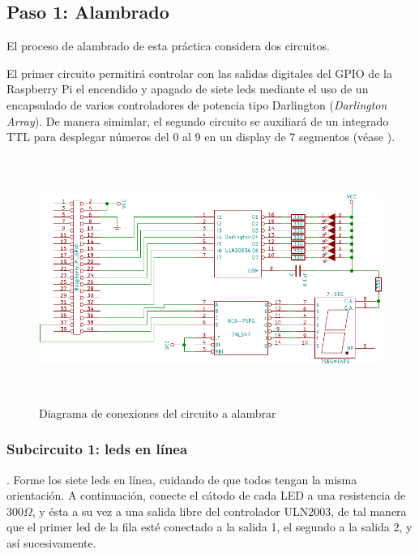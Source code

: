 \documentclass[letterpaper,10.5pt]{article}
\begin{document}
%
%
\subsection{Paso 1: Alambrado}%
\label{sec:step1}

El proceso de alambrado de esta práctica considera dos circuitos.

El primer circuito permitirá controlar con las salidas digitales del GPIO de la Raspberry Pi el encendido y apagado de siete leds mediante el uso de un encapsulado de varios controladores de potencia tipo Darlington (\textit{Darlington Array}).
De manera simimlar, el segundo circuito se auxiliará de un integrado TTL para desplegar números del 0 al 9 en un display de 7 segmentos (véase ).

\begin{figure}[H]
	\centering%
	\includegraphics[width=0.9\columnwidth,height=8cm,keepaspectratio]{img/p03-diagram.pdf} %
	\caption{Diagrama de conexiones del circuito a alambrar}
	\label{fig:wiring-diagram} %
\end{figure}

\subsubsection{Subcircuito 1: leds en línea}.
Forme los siete leds en línea, cuidando de que todos tengan la misma orientación. A continuación, conecte el cátodo de cada LED a una resistencia de 300$\Omega$, y ésta a su vez a una salida libre del controlador ULN2003, de tal manera que el primer led de la fila esté conectado a la salida 1, el segundo a la salida 2, y así sucesivamente.
\end{document}

